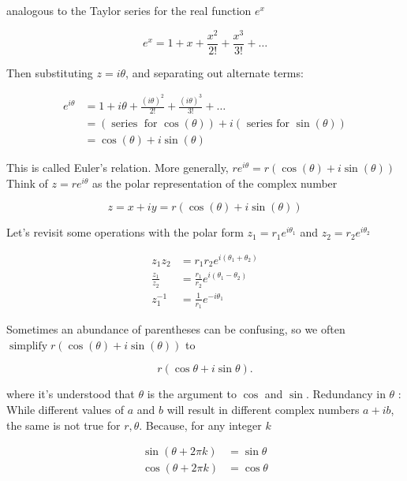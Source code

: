\documentclass[main.tex]{subfiles}
\begin{document}
    analogous to the Taylor series for the real function $e^{x}$
    
    $$e^{x}=1+x+\frac{x^{2}}{2 !}+\frac{x^{3}}{3 !}+\ldots$$
    
    Then substituting $z=i \theta$, and separating out alternate terms:
    
    \begin{align*}
    e^{i \theta}    &=1+i \theta+\frac{(i \theta)^{2}}{2 !}+\frac{(i \theta)^{3}}{3 !}+\ldots \\
                    &=(\operatorname{series} \text { for } \cos (\theta))+i(\text { series for } \sin (\theta)) \\
                    &=\cos (\theta)+i \sin (\theta)
    \end{align*}
    
    This is called Euler's relation. More generally, $r e^{i \theta}=r(\cos (\theta)+i \sin (\theta))$ Think of $z=r e^{i \theta}$ as the polar representation of the complex number
    
    $$z=x+i y=r(\cos (\theta)+i \sin (\theta))$$
    
    Let's revisit some operations with the polar form $z_{1}=r_{1} e^{i \theta_{1}}$ and $z_{2}=r_{2} e^{i \theta_{2}}$
    
    \begin{align*}
    z_{1} z_{2} &=r_{1} r_{2} e^{i\left(\theta_{1}+\theta_{2}\right)} \\
    \frac{z_{1}}{z_{2}} &=\frac{r_{1}}{r_{2}} e^{i\left(\theta_{1}-\theta_{2}\right)} \\
    z_{1}^{-1} &=\frac{1}{r_{1}} e^{-i \theta_{1}}
    \end{align*}
    
    Sometimes an abundance of parentheses can be confusing, so we often $\operatorname{simplify} r(\cos (\theta)+i \sin (\theta))$ to
    
    $$r(\cos \theta+i \sin \theta).$$
    
    where it's understood that $\theta$ is the argument to $\cos$ and $\sin$. Redundancy in $\theta$ : While different values of $a$ and $b$ will result in different complex numbers $a+i b$, the same is not true for $r, \theta$. Because, for any integer $k$
    
    \begin{align*}
    \sin (\theta+2 \pi k) &=\sin \theta \\
    \cos (\theta+2 \pi k) &=\cos \theta
    \end{align*}
    
\end{document}

